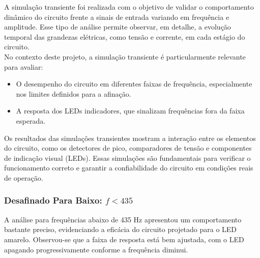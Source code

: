 \documentclass[a4paper, 12pt]{article}
\begin{document}
A simulação transiente foi realizada com o objetivo de validar o comportamento dinâmico do circuito frente a sinais de entrada variando em frequência e amplitude. Esse tipo de análise permite observar, em detalhe, a evolução temporal das grandezas elétricas, como tensão e corrente, em cada estágio do circuito.\\

No contexto deste projeto, a simulação transiente é particularmente relevante para avaliar:

\begin{itemize}
    \item O desempenho do circuito em diferentes faixas de frequência, especialmente nos limites definidos para a afinação.
    \item A resposta dos LEDs indicadores, que sinalizam frequências fora da faixa esperada.
\end{itemize}

Os resultados das simulações transientes mostram a interação entre os elementos do circuito, como os detectores de pico, comparadores de tensão e componentes de indicação visual (LEDs). Essas simulações são fundamentais para verificar o funcionamento correto e garantir a confiabilidade do circuito em condições reais de operação.


\subsubsection{Desafinado Para Baixo: $f < 435$}

A análise para frequências abaixo de 435 Hz apresentou um comportamento bastante preciso, evidenciando a eficácia do circuito projetado para o LED amarelo. Observou-se que a faixa de resposta está bem ajustada, com o LED apagando progressivamente conforme a frequência diminui. 
\end{document}
